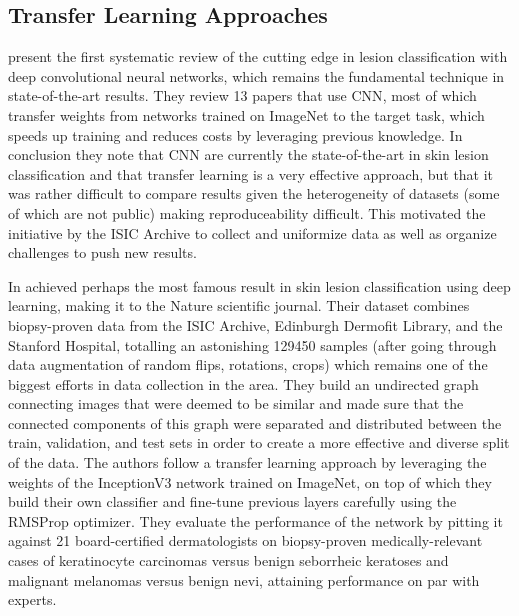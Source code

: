 \subsection{Transfer Learning Approaches}

\citeauthor{Brinker2018} \cite{Brinker2018} present the first systematic review of the cutting edge in lesion classification with deep convolutional neural networks, which remains the fundamental technique in state-of-the-art results. They review 13 papers that use \ac{CNN}, most of which transfer weights from networks trained on ImageNet to the target task, which speeds up training and reduces costs by leveraging previous knowledge. In conclusion they note that \ac{CNN} are currently the state-of-the-art in skin lesion classification and that transfer learning is a very effective approach, but that it was rather difficult to compare results given the heterogeneity of datasets (some of which are not public) making reproduceability difficult. This motivated the initiative by the \ac{ISIC} Archive to collect and uniformize data as well as organize challenges to push new results.

In \citeyear{nature2017} \citeauthor{nature2017} \cite{nature2017} achieved perhaps the most famous result in skin lesion classification using deep learning, making it to the Nature scientific journal. Their dataset combines biopsy-proven data from the \ac{ISIC} Archive, Edinburgh Dermofit Library, and the Stanford Hospital, totalling an astonishing 129450 samples (after going through data augmentation of random flips, rotations, crops) which remains one of the biggest efforts in data collection in the area. They build an undirected graph connecting images that were deemed to be similar and made sure that the connected components of this graph were separated and distributed between the train, validation, and test sets in order to create a more effective and diverse split of the data. The authors follow a transfer learning approach by leveraging the weights of the InceptionV3 network trained on ImageNet, on top of which they build their own classifier and fine-tune previous layers carefully using the RMSProp optimizer. They evaluate the performance of the network by pitting it against 21 board-certified dermatologists on biopsy-proven medically-relevant cases of keratinocyte carcinomas versus benign seborrheic keratoses and malignant melanomas versus benign nevi, attaining performance on par with experts.

